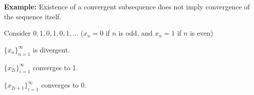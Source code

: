 \documentclass[10pt,aspectratio=149]{beamer}
\begin{document}
\begin{frame}

\textbf{Example:}
Existence of a convergent subsequence does not imply
convergence of the sequence itself.

\medskip
\pause
Consider $0,1,0,1,0,1,\ldots$ \quad
($x_n = 0$ if $n$ is odd, and $x_n = 1$ if $n$ is even)

\medskip
\pause

$\{ x_n \}_{n=1}^\infty$ is divergent.

\medskip
\pause

$\{ x_{2i} \}_{i=1}^\infty$ converges to 1.

\medskip
\pause

$\{ x_{2i+1} \}_{i=1}^\infty$ converges to 0.
\end{frame}
\end{document}
